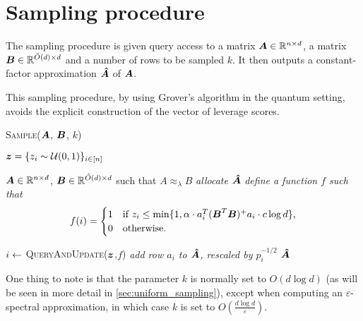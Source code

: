 \section{Sampling procedure}

The sampling procedure is given query access to a matrix $\boldsymbol{A} \in
\mathbb{R}^{n \times d}$, a matrix $\boldsymbol{B} \in \mathbb{R}^{\tilde O(d) \times
d}$ and a number of rows to be sampled $k$. It then outputs a constant-factor
approximation $\boldsymbol{\hat{A}}$ of $\boldsymbol{A}$.

This sampling procedure, by using Grover's algorithm in the quantum setting,
avoids the explicit construction of the vector of leverage scores.

\begin{algorithm}[H]
  \caption{\textsc{Sample}($\boldsymbol{A}$, $\boldsymbol{B}$, $k$)}
  \label{alg:sample}
  \begin{algorithmic}[1]
    \Ensure $\boldsymbol{z} = \{z_i \sim \mathcal U (0, 1)\}_{i \in [n]}$

    \Ensure $\boldsymbol{A} \in \mathbb R ^{n \times d}$, $\boldsymbol{B} \in \mathbb R^{\tilde O(d) \times d}$ such that $A \approx_\lambda B$
    \State \textit{allocate $\boldsymbol{\hat{A}}$}
    \State \textit{define a function $f$ such that}
    \begin{equation*}
      f(i) = \begin{cases}
               1 & \text{if } z_i \leq \min \{1, \alpha \cdot a_i^{T}(\boldsymbol{B}^{T}\boldsymbol{B})^{+} a_i \cdot c \log d\} \text{,}\\
               0 & \text{otherwise.}
             \end{cases}
    \end{equation*}

    \Repeat
      \State $i \leftarrow$ \textsc{QueryAndUpdate}($\boldsymbol z$,$f$)
      \State \textit{add row $a_i$ to $\boldsymbol {\hat A}$, rescaled by $p_i^{-1/2}$}
    \State \Return $\boldsymbol {\hat A}$
  \end{algorithmic}
\end{algorithm}

One thing to note is that the parameter $k$ is normally set to $O(d \log d)$ (as
will be seen in more detail in \autoref{sec:uniform_sampling}), except when
computing an $\varepsilon$-spectral approximation, in which case $k$ is set to
$O(\frac{d\log d}{\varepsilon})$.
